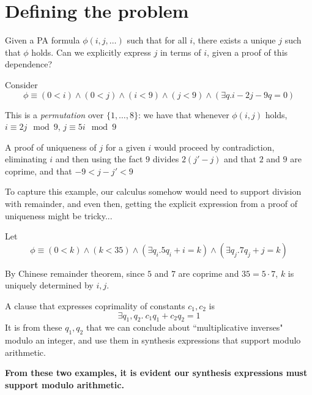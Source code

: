 \documentclass{article}
\begin{document}
\section{Defining the problem}

\begin{question}[Adwait]
Given a PA formula $\phi(i, j, \dots)$ such that for all $i$, there exists a unique $j$ such that $\phi$ holds. Can we explicitly express $j$ in terms of $i$, given a proof of this dependence?
\end{question}

\begin{example}
Consider $$\phi \equiv (0 < i) \land (0 < j) \land (i < 9) \land (j < 9) \land (\exists q. i - 2j -9q = 0)$$
\end{example}
This is a \emph{permutation} over $\{1, \dots, 8\}$: we have that whenever $\phi(i, j)$ holds, $i \equiv 2j \mod 9$, $j \equiv 5i \mod 9$

A proof of uniqueness of $j$ for a given $i$ would proceed by contradiction, eliminating $i$ and then using the fact $9$ divides $2(j' - j)$ and that $2$ and $9$ are coprime, and that $-9 <  j - j' < 9$ 

To capture this example, our calculus somehow would need to support division with remainder, and even then, getting the explicit expression from a proof of uniqueness might be tricky...

\begin{example}
Let
$$
\phi \equiv (0 < k) \land (k < 35) \land (\exists q_i. 5q_i + i = k) \land (\exists q_j . 7q_j + j = k)
$$
\end{example}
By Chinese remainder theorem, since $5$ and $7$ are coprime and $35 = 5 \cdot 7$, $k$ is uniquely determined by $i, j$.

A clause that expresses coprimality of constants $c_1, c_2$ is 
$$
\exists q_1, q_2 . ~c_1q_1 + c_2 q_2 = 1
$$
It is from these $q_1, q_2$ that we can conclude about ``multiplicative inverses" modulo an integer, and use them in synthesis expressions that support modulo arithmetic.

\textbf{From these two examples, it is evident our synthesis expressions must support modulo arithmetic.}
\end{document}
